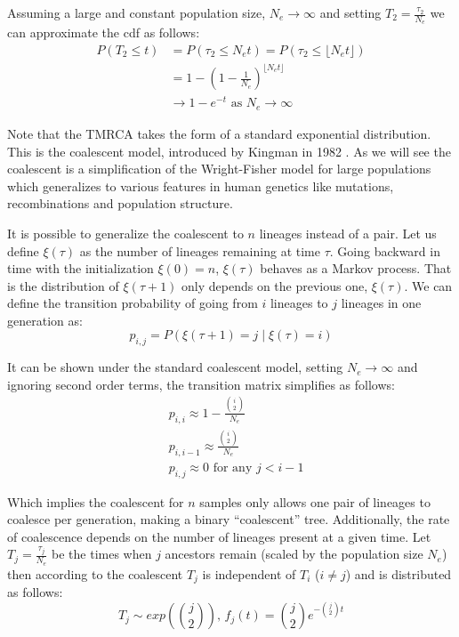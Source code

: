 Assuming a large and constant population size, $N_e \rightarrow \infty$ and setting $T_2 = \frac{\tau_2}{N_e}$ we can approximate the cdf as follows:
\begin{equation}
\begin{aligned}
    P(T_2 \leq t) &= P(\tau_2 \leq N_et) = P(\tau_2 \leq \lfloor N_et \rfloor) \\
    &= 1 - \left(1 - \frac{1}{N_e}\right)^{\lfloor N_et \rfloor} \\
    & \rightarrow 1 - e^{-t} \text{  as  } N_e \rightarrow \infty
\end{aligned}
\end{equation}

Note that the TMRCA takes the form of a standard exponential distribution. This is the coalescent model, introduced by Kingman in 1982 \cite{kingman1982coalescent, Kingman1982b, Kingman1982c}. As we will see the coalescent is a simplification of the Wright-Fisher model \cite{Wright1931, Fisher1930} for large populations which generalizes to various features in human genetics like mutations, recombinations and population structure. 

It is possible to generalize the coalescent to \(n\) lineages instead of a pair. Let us define $\xi(\tau)$ as the number of lineages remaining at time $\tau$. Going backward in time with the initialization $\xi(0) = n$, $\xi(\tau)$ behaves as a Markov process. That is the distribution of $\xi(\tau + 1)$ only depends on the previous one, $\xi(\tau)$. We can define the transition probability of going from $i$ lineages to $j$ lineages in one generation as:
\begin{equation}
    p_{i,j} = P(\xi(\tau + 1) = j \mid \xi(\tau) = i)
\end{equation}

It can be shown under the standard coalescent model, setting $N_e \rightarrow \infty$ and ignoring second order terms, the transition matrix simplifies as follows:
\begin{equation}
\begin{aligned}
    &p_{i,i} \approx 1 -  \frac{\binom{i}{2}}{N_e} \\
    &p_{i,i-1} \approx \frac{\binom{i}{2}}{N_e} \\
    &p_{i,j} \approx 0 \text{  for any  } j < i - 1
\end{aligned}
\end{equation}

Which implies the coalescent for \(n\) samples only allows one pair of lineages to coalesce per generation, making a binary ``coalescent'' tree. Additionally, the rate of coalescence depends on the number of lineages present at a given time. Let $T_j = \frac{\tau_j}{N_e}$ be the times when $j$ ancestors remain (scaled by the population size $N_e$) then according to the coalescent $T_j$ is independent of $T_i$ ($i \neq j$) and is distributed as follows:
\begin{equation}
    T_j \sim exp \left( \binom{j}{2} \right)  \text{,   } f_j(t) =  \binom{j}{2}e^{- \binom{j}{2}t}
\end{equation}

